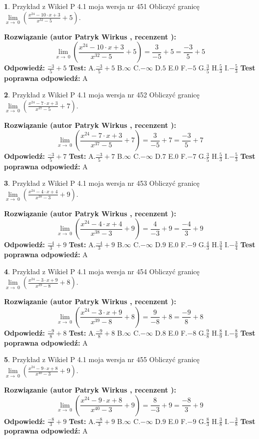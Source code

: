 \documentclass[12pt, a4paper]{article}
\theoremstyle{definition} %
\newtheorem{zad}{}
\newcommand{\zadStart}[1]{\begin{zad}#1\newline}
\newcommand{\zadStop}{\end{zad}}
\newcommand{\rozwStart}[2]{\noindent \textbf{Rozwiązanie (autor #1 , recenzent #2): }\newline}
\newcommand{\rozwStop}{\newline}
\newcommand{\odpStart}{\noindent \textbf{Odpowiedź:}\newline}
\newcommand{\odpStop}{\newline}
\newcommand{\testStart}{\noindent \textbf{Test:}\newline}
\newcommand{\testStop}{\newline}
\newcommand{\kluczStart}{\noindent \textbf{Test poprawna odpowiedź:}\newline}
\newcommand{\kluczStop}{\newline}
\begin{document}
\zadStart{Przykład z Wikieł P 4.1 moja wersja nr 451}
Obliczyć granicę $\lim\limits_{x\to\ 0}(\frac{x^{24}-10 \cdot x +3}{x^{32}-5}+5)$.
\zadStop
\rozwStart{Patryk Wirkus}{}
$$\lim\limits_{x\to\ 0}(\frac{x^{24}-10 \cdot x +3}{x^{32}-5}+5)=\frac{3}{-5}+5=\frac{-3}{5}+5$$
\rozwStop
\odpStart
$\frac{-3}{5}+5$
\odpStop
\testStart
A.$\frac{-3}{5}+5$
B.$\infty$
C.$-\infty$
D.$5$
E.$0$
F.$-5$
G.$\frac{3}{5}$
H.$\frac{5}{3}$
I.$-\frac{5}{3}$
\testStop
\kluczStart
A
\kluczStop



\zadStart{Przykład z Wikieł P 4.1 moja wersja nr 452}
Obliczyć granicę $\lim\limits_{x\to\ 0}(\frac{x^{24}-7 \cdot x +3}{x^{37}-5}+7)$.
\zadStop
\rozwStart{Patryk Wirkus}{}
$$\lim\limits_{x\to\ 0}(\frac{x^{24}-7 \cdot x +3}{x^{37}-5}+7)=\frac{3}{-5}+7=\frac{-3}{5}+7$$
\rozwStop
\odpStart
$\frac{-3}{5}+7$
\odpStop
\testStart
A.$\frac{-3}{5}+7$
B.$\infty$
C.$-\infty$
D.$7$
E.$0$
F.$-7$
G.$\frac{3}{5}$
H.$\frac{5}{3}$
I.$-\frac{5}{3}$
\testStop
\kluczStart
A
\kluczStop



\zadStart{Przykład z Wikieł P 4.1 moja wersja nr 453}
Obliczyć granicę $\lim\limits_{x\to\ 0}(\frac{x^{24}-4 \cdot x +4}{x^{38}-3}+9)$.
\zadStop
\rozwStart{Patryk Wirkus}{}
$$\lim\limits_{x\to\ 0}(\frac{x^{24}-4 \cdot x +4}{x^{38}-3}+9)=\frac{4}{-3}+9=\frac{-4}{3}+9$$
\rozwStop
\odpStart
$\frac{-4}{3}+9$
\odpStop
\testStart
A.$\frac{-4}{3}+9$
B.$\infty$
C.$-\infty$
D.$9$
E.$0$
F.$-9$
G.$\frac{4}{3}$
H.$\frac{3}{4}$
I.$-\frac{3}{4}$
\testStop
\kluczStart
A
\kluczStop



\zadStart{Przykład z Wikieł P 4.1 moja wersja nr 454}
Obliczyć granicę $\lim\limits_{x\to\ 0}(\frac{x^{24}-3 \cdot x +9}{x^{39}-8}+8)$.
\zadStop
\rozwStart{Patryk Wirkus}{}
$$\lim\limits_{x\to\ 0}(\frac{x^{24}-3 \cdot x +9}{x^{39}-8}+8)=\frac{9}{-8}+8=\frac{-9}{8}+8$$
\rozwStop
\odpStart
$\frac{-9}{8}+8$
\odpStop
\testStart
A.$\frac{-9}{8}+8$
B.$\infty$
C.$-\infty$
D.$8$
E.$0$
F.$-8$
G.$\frac{9}{8}$
H.$\frac{8}{9}$
I.$-\frac{8}{9}$
\testStop
\kluczStart
A
\kluczStop



\zadStart{Przykład z Wikieł P 4.1 moja wersja nr 455}
Obliczyć granicę $\lim\limits_{x\to\ 0}(\frac{x^{24}-9 \cdot x +8}{x^{40}-3}+9)$.
\zadStop
\rozwStart{Patryk Wirkus}{}
$$\lim\limits_{x\to\ 0}(\frac{x^{24}-9 \cdot x +8}{x^{40}-3}+9)=\frac{8}{-3}+9=\frac{-8}{3}+9$$
\rozwStop
\odpStart
$\frac{-8}{3}+9$
\odpStop
\testStart
A.$\frac{-8}{3}+9$
B.$\infty$
C.$-\infty$
D.$9$
E.$0$
F.$-9$
G.$\frac{8}{3}$
H.$\frac{3}{8}$
I.$-\frac{3}{8}$
\testStop
\kluczStart
A
\kluczStop
\end{document}
